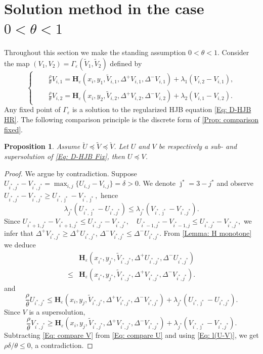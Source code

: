 \documentclass[11pt]{article}
\numberwithin{equation}{section}
\numberwithin{algorithm}{section}
\newtheorem{proposition}[proposition]{Proposition}
\newcommand{\lc}{\left(}
\newcommand{\rc}{\right)}
\newcommand{\eps}{\varepsilon}
\newcommand{\beq}{\begin{equation}}
\newcommand{\eeq}{\end{equation}}
\theoremstyle{plain}
\newcommand{\D}{\Delta}
\begin{document}
\section{Solution method in the case $0<\theta<1$}\label{Sec: early}
Throughout this section we make the standing assumption $0<\theta<1$.
Consider the map $(V_1,V_2)=\Gamma_{\eps}(\widetilde{V}_1,\widetilde{V}_2)$ defined by
\beq\label{Eq: D-HJB Fix}
\left\{
      \begin{aligned}
\quad &\frac{\rho}{\theta} V_{i,1}
=\boldsymbol{H}_{\eps}\lc x_i,y_1,\widetilde{V}_{i,1},\D^+{V_{i,1}},\D^-{V_{i,1}}\rc
+\lambda_1\lc V_{i,2}-V_{i,1} \rc,\\
&\frac{\rho}{\theta} V_{i,2}
=\boldsymbol{H}_{\eps}\lc x_i,y_2,\widetilde{V}_{i,2},\D^+{V_{i,2}},\D^-{V_{i,2}}\rc
+\lambda_2\lc V_{i,1}-V_{i,2} \rc.
     \end{aligned}
   \right.
\eeq
Any fixed point of $\Gamma_{\eps}$ is a solution to the regularized HJB equation \cref{Eq: D-HJB HR}.
The following comparison principle is the discrete form of \cref{Prop: comparison fixed}. 
\begin{proposition}\label{Prop: comparison eps}
Assume $\check{U}\preceq \widetilde{V}\preceq \check{V}$. Let ${U}$ and ${V}$ be respectively a sub- and supersolution of \cref{Eq: D-HJB Fix}, then ${U}\preceq {V}$.
\end{proposition}
\begin{proof}
We argue by contradiction. Suppose 
$
{U}_{i^*,j^*}-{V}_{i^*,j^*}=\max_{i,j}\{{U}_{i,j}-{V}_{i,j}\}=\delta>0.
$
We denote $\bar \jmath^*=3-j^*$ and observe
$
{U}_{i^*,j^*}-{V}_{i^*,j^*}\geq {U}_{i^*,\bar \jmath^*}-{V}_{i^*,\bar \jmath^*},
$
hence
\beq\label{Eq: l(U-V)}
\lambda_{j^*}({U}_{i^*,\bar \jmath^*}-{U}_{i^*,j^*})\leq \lambda_{j^*}({V}_{i^*,\bar \jmath^*}-{V}_{i^*,j^*}).
\eeq
Since 
$
{U}_{i^*+1,j^*}-{V}_{i^*+1,j^*}\leq {U}_{i^*,j^*}-{V}_{i^*,j^*},\quad {U}_{i^*-1,j^*}-{V}_{i^*-1,j}\leq {U}_{i^*,j^*}-{V}_{i^*,j^*},
$
we infer that
$
\D^+{{V}_{i^*,j^*}}\geq \D^+{{U}_{i^*,j^*}}$, $\D^-{{V}_{i^*,j^*}}\leq \D^-{{U}_{i^*,j^*}}$. From \cref{Lemma: H monotone} we deduce 
\beq\label{Eq: HU HV0}
\begin{aligned}
&\boldsymbol{H}_{\eps}\lc x_{i^*},y_{j^*},\widetilde{V}_{i^*,j^*},\D^+{{U}_{i^*,j^*}},\D^-{{U}_{i^*,j^*}}\rc\\
\leq {}&\boldsymbol{H}_{\eps}\lc x_{i^*},y_{j^*},\widetilde{V}_{i^*,j^*},\D^+{{V}_{i^*,j^*}},\D^-{{V}_{i^*,j^*}}\rc.
\end{aligned}
\eeq
and 
\beq\label{Eq: compare U}
\frac{\rho}{\theta} {U}_{i^*,j^*}\leq \boldsymbol{H}_{\eps}\lc x_i,y_j,\widetilde{V}_{i^*,j^*},\D^+{{V}_{i^*,j^*}},\D^-{{V}_{i^*,j^*}}\rc+\lambda_{j^*}({U}_{i^*,\bar \jmath^*}-{U}_{i^*,j^*}).
\eeq
Since ${V}$ is a supersolution,
\beq\label{Eq: compare V}
\frac{\rho}{\theta}{V}_{i^*,j^*}\geq \boldsymbol{H}_{\eps}\lc x_i,y_j,\widetilde{V}_{i^*,j^*},\D^+{{V}_{i^*,j^*}},\D^-{{V}_{i^*,j^*}}\rc+\lambda_{j^*}({V}_{i^*,\bar \jmath^*}-{V}_{i^*,j^*}).
\eeq
Subtracting \cref{Eq: compare V} from \cref{Eq: compare U} and using \cref{Eq: l(U-V)}, we get $\rho \delta/\theta\leq 0$, a contradiction. 
\end{proof}
\end{document}

